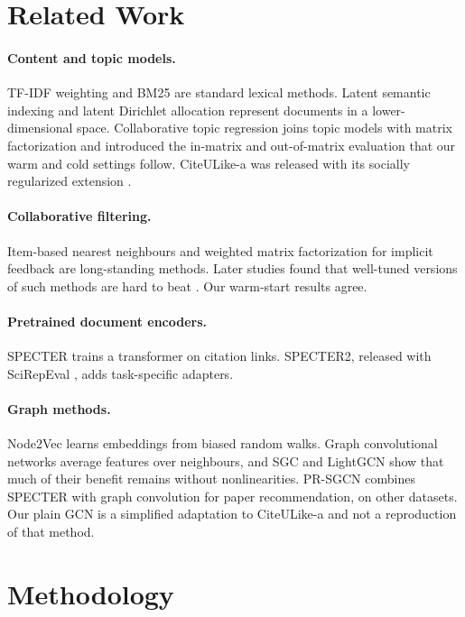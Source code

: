 \documentclass[10pt]{article}
\begin{document}
\section{Related Work}
\paragraph{Content and topic models.} TF-IDF weighting \citep{salton1988} and BM25 \citep{robertson2009} are standard lexical methods. Latent semantic indexing \citep{deerwester1990} and latent Dirichlet allocation \citep{blei2003} represent documents in a lower-dimensional space. Collaborative topic regression \citep{wang2011} joins topic models with matrix factorization and introduced the in-matrix and out-of-matrix evaluation that our warm and cold settings follow. CiteULike-a was released with its socially regularized extension \citep{wang2013}.

\paragraph{Collaborative filtering.} Item-based nearest neighbours \citep{sarwar2001} and weighted matrix factorization for implicit feedback \citep{hu2008} are long-standing methods. Later studies found that well-tuned versions of such methods are hard to beat \citep{dacrema2019,rendle2022}. Our warm-start results agree.

\paragraph{Pretrained document encoders.} SPECTER \citep{cohan2020} trains a transformer on citation links. SPECTER2, released with SciRepEval \citep{singh2023}, adds task-specific adapters.

\paragraph{Graph methods.} Node2Vec \citep{grover2016} learns embeddings from biased random walks. Graph convolutional networks \citep{kipf2017} average features over neighbours, and SGC \citep{wu2019} and LightGCN \citep{he2020} show that much of their benefit remains without nonlinearities. PR-SGCN \citep{guo2025} combines SPECTER with graph convolution for paper recommendation, on other datasets. Our plain GCN is a simplified adaptation to CiteULike-a and not a reproduction of that method.

\section{Methodology}
\end{document}
